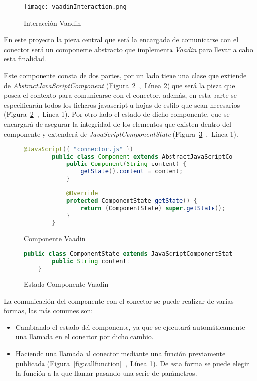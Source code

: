  			
 	
 	\begin{figure}[!tb]
 		\centering
 		\texttt{[image: vaadinInteraction.png]}
 		\caption{Interacción Vaadin}\label{fig:vaadinInteraction}
 	\end{figure}
 	
 	
 	
 			
 En este proyecto la pieza central que será la encargada de comunicarse con el conector será un componente abstracto que implementa \emph{Vaadin} para llevar a cabo esta finalidad.

Este componente consta de dos partes, por un lado tiene una clase que extiende de \emph{AbstractJavaScriptComponent} (Figura~\ref{fig:componenteVaadin}~,~Línea 2) que será la pieza que posea el contexto para comunicarse con el conector, además, en esta parte se especificarán todos los ficheros javascript u hojas de estilo que sean necesarios (Figura~\ref{fig:componenteVaadin}~,~Línea 1). Por otro lado el estado de dicho componente, que se encargará de asegurar la integridad de los elementos que existen dentro del componente y extenderá de \emph{JavaScriptComponentState} (Figura~\ref{fig:estadoComponenteVaadin}~,~Línea 1).
 	
 	\begin{figure}[!tb]
 		\centering
 		\begin{lstlisting}[language=Java]
	 	@JavaScript({ "connector.js" })
	 	public class Component extends AbstractJavaScriptComponent {
		 	public Component(String content) {
		 		getState().content = content;
		 	}
		 	
		 	@Override
		 	protected ComponentState getState() {
		 		return (ComponentState) super.getState();
		 	}
	 	}
 		\end{lstlisting}
 		\caption{Componente Vaadin}
 		\label{fig:componenteVaadin}
 	\end{figure}


 \begin{figure}[!tb]
 	\centering
 	\begin{lstlisting}[language=Java]
	public class ComponentState extends JavaScriptComponentState {
		public String content;
	}
 	\end{lstlisting}
 	\caption{Estado Componente Vaadin}
 	\label{fig:estadoComponenteVaadin}
 \end{figure}


	La comunicación del componente con el conector se puede realizar de varias formas, las más comunes son:
	\begin{itemize}
		\item  Cambiando el estado del componente, ya que se ejecutará automáticamente una llamada en el conector por dicho cambio.
		\item  Haciendo una llamada al conector mediante una función previamente publicada (Figura~\ref{fig:callfunction}~,~Línea 1). De esta forma se puede elegir la función a la que llamar pasando una serie de parámetros.
	\end{itemize}

